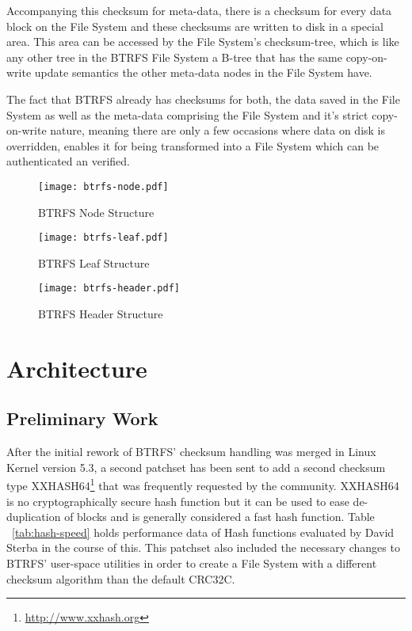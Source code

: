 \documentclass[10pt]{article}
\begin{document}
Accompanying this checksum for meta-data, there is a checksum for every data
block on the File System and these checksums are written to disk in a special
area. This area can be accessed by the File System's checksum-tree, which is
like any other tree in the BTRFS File System a B-tree that has the same
copy-on-write update semantics the other meta-data nodes in the File System
have.

The fact that BTRFS already has checksums for both, the data saved in the
File System as well as the meta-data comprising the File System and it's
strict copy-on-write nature, meaning there are only a few occasions where data
on disk is overridden, enables it for being transformed into a File System
which can be authenticated an verified.

\begin{figure}
	\centering
	\texttt{[image: btrfs-node.pdf]}
	\caption{BTRFS Node Structure}
	\label{fig:btrfs-node}
\end{figure}

\begin{figure}
	\centering
	\texttt{[image: btrfs-leaf.pdf]}
	\caption{BTRFS Leaf Structure}
	\label{fig:btrfs-leaf}
\end{figure}

\begin{figure}
	\centering
	\texttt{[image: btrfs-header.pdf]}
	\caption{BTRFS Header Structure}
	\label{fig:btrfs-header}
\end{figure}

\section{Architecture}
\subsection{Preliminary Work}
After the initial rework of BTRFS' checksum handling was merged in Linux
Kernel version 5.3, a second patchset has been sent to add a second checksum
type XXHASH64\footnote{\href{http://www.xxhash.org}{http://www.xxhash.org}}
that was frequently requested by the community. XXHASH64 is no
cryptographically secure hash function but it can be used to ease
de-duplication of blocks and is generally considered a fast hash function. Table
~\ref{tab:hash-speed} holds performance data of Hash functions evaluated by
David Sterba in the course of this.
This patchset also included the necessary changes to BTRFS' user-space
utilities in order to create a File System with a different checksum algorithm
than the default CRC32C.
\end{document}
